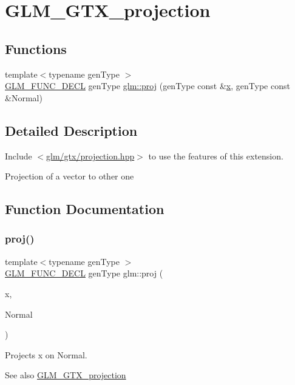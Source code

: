 \hypertarget{group__gtx__projection}{}\section{G\+L\+M\+\_\+\+G\+T\+X\+\_\+projection}
\label{group__gtx__projection}
\subsection*{Functions}
\begin{DoxyCompactItemize}
\item 
{\footnotesize template$<$typename gen\+Type $>$ }\\\mbox{\hyperlink{setup_8hpp_ab2d052de21a70539923e9bcbf6e83a51}{G\+L\+M\+\_\+\+F\+U\+N\+C\+\_\+\+D\+E\+CL}} gen\+Type \mbox{\hyperlink{group__gtx__projection_ga58384b7170801dd513de46f87c7fb00e}{glm\+::proj}} (gen\+Type const \&\mbox{\hyperlink{_s_d_l__opengl_8h_ad0e63d0edcdbd3d79554076bf309fd47}{x}}, gen\+Type const \&Normal)
\end{DoxyCompactItemize}


\subsection{Detailed Description}
Include $<$\mbox{\hyperlink{projection_8hpp}{glm/gtx/projection.\+hpp}}$>$ to use the features of this extension.

Projection of a vector to other one 

\subsection{Function Documentation}
\mbox{\label{group__gtx__projection_ga58384b7170801dd513de46f87c7fb00e}} 
\subsubsection{\texorpdfstring{proj()}{proj()}}
{\footnotesize\ttfamily template$<$typename gen\+Type $>$ \\
\mbox{\hyperlink{setup_8hpp_ab2d052de21a70539923e9bcbf6e83a51}{G\+L\+M\+\_\+\+F\+U\+N\+C\+\_\+\+D\+E\+CL}} gen\+Type glm\+::proj (\begin{DoxyParamCaption}\item[{gen\+Type const \&}]{x,  }\item[{gen\+Type const \&}]{Normal }\end{DoxyParamCaption})}

Projects x on Normal.

\begin{DoxySeeAlso}{See also}
\mbox{\hyperlink{group__gtx__projection}{G\+L\+M\+\_\+\+G\+T\+X\+\_\+projection}} 
\end{DoxySeeAlso}
